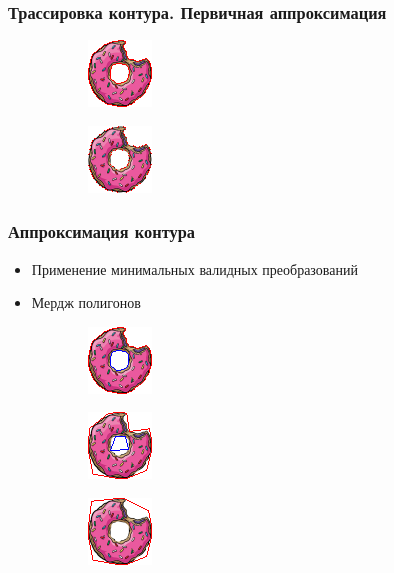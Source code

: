 \documentclass[10pt, unicode]{beamer}
\begin{document}
    \begin{frame}
        \frametitle{Трассировка контура. Первичная аппроксимация}
        \begin{figure}[H]
            \centering
            \begin{subfigure}[l]{0.50\linewidth}
                \centering
                \includegraphics[scale=2]{donutpixel_contour_none.png}
            \end{subfigure}
            \begin{subfigure}{0.49\linewidth}
                \centering
                \includegraphics[scale=2]{donutpixel_contour_simple.png}
            \end{subfigure}
        \end{figure}
    \end{frame}
    \begin{frame}
        \frametitle{Аппроксимация контура}
        \begin{itemize}
            \item Применение минимальных валидных преобразований
            \item Мердж полигонов
        \end{itemize}
        \begin{figure}[H]
            \centering
            \begin{subfigure}[l]{0.33\linewidth}
                \centering
                \includegraphics[scale=1.5]{donutpixel_approx_start.png}
            \end{subfigure}
            \begin{subfigure}{0.33\linewidth}
                \centering
                \includegraphics[scale=1.5]{donutpixel_approx_mid.png}
            \end{subfigure}\begin{subfigure}{0.33\linewidth}
                \centering
                \includegraphics[scale=1.5]{donutpixel_approx_end.png}
            \end{subfigure}
        \end{figure}
    \end{frame}
\end{document}
